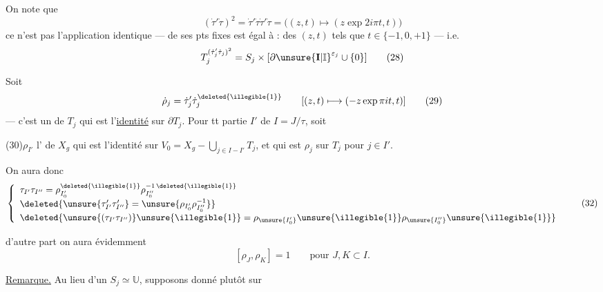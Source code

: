 On note que
\[
(\dot\tau'\dot\tau)^2
=\dot\tau'\dot\tau\dot\tau'\dot\tau
=\bigl((z,t)\longmapsto(z\exp 2i\pi t,t)\bigr)
\]
ce n'est pas l'application identique ---  de ses pts fixes est égal à : 
 des $(z,t)$ tels que $t\in\{-1,0,+1\}$ --- i.e.
\[
T_j^{(\dot\tau'_j\dot\tau_j)^2}
=S_j\times[\partial\unsure{\mathbf I|\mathbb I}^{\varepsilon_j}\cup\{0\}]
\tag{28}
\]



Soit 
\[
\dot\rho_j=\dot\tau'_j\dot\tau_j^{\deleted{\illegible{1}}}
\qquad [(z,t)\longmapsto(-z\exp\pi it,t)]
\tag{29}
\]
--- c'est un  de $T_j$ qui est l'\uline{identité} sur $\partial T_j$.
 Pour tt partie $I'$ de $I=J/\tau$, soit

(30)\quad $\rho_{I'}$ l' de $X_g$ qui est l'identité sur
$V_0=X_g-\bigcup_{j\in I-I'}T_j$,
et qui est $\rho_j$ sur $T_j$ pour $j\in I'$.



On aura donc
\[
\left\{
\begin{array}{l}
\tau_{I'}\tau_{I''}
=\rho_{I'_0}^{\deleted{\illegible{1}}}\rho_{I''_0}^{-1\,\deleted{\illegible{1}}}
\\[3pt]
\deleted{\unsure{\tau'_{I'}\tau'_{I''}}=\unsure{\rho_{I'_0}\rho_{I''_0}^{-1}}}
\\[3pt]
\deleted{\unsure{(\tau_{I'}\tau_{I''})}\unsure{\illegible{1}}=\rho_{\unsure{I'_0}}\unsure{\illegible{1}}\rho_{\unsure{I''_0}}\unsure{\illegible{1}}}
\end{array}
\right.
\tag{32}
\]

d'autre part on aura évidemment
\[
[\rho_J,\rho_K]=1\qquad\text{pour }J,K\subset I.
\tag{33}
\]

\uline{Remarque.} Au lieu d'un  $S_j\simeq\mathbb U$,
supposons donné plutôt sur

